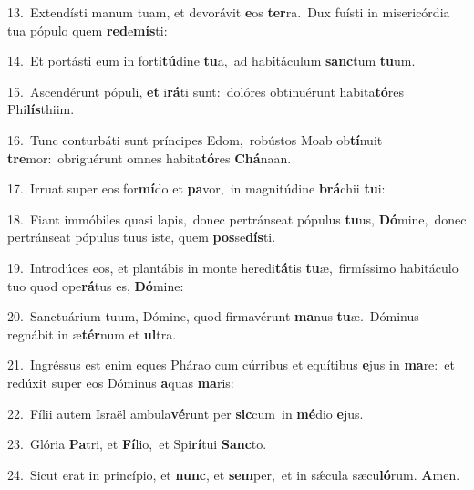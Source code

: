 {\numbfont\textcolor{\numbcolor}{13.}}~Extendísti manum tuam, et devorávit \textbf{e}\-os \textbf{ter}\-ra.~\star Dux fuísti in misericórdia tua pópulo quem \textbf{red}\-e\-\textbf{mís}\-ti:\par
{\numbfont\textcolor{\numbcolor}{14.}}~Et portásti eum in forti\-\textbf{tú}\-dine \textbf{tu}\-a,~\star ad habitáculum \textbf{sanc}\-tum \textbf{tu}\-um.\par
{\numbfont\textcolor{\numbcolor}{15.}}~Ascendérunt pópuli, \textbf{et} i\-\textbf{rá}\-ti sunt:~\star dolóres obtinuérunt habita\-\textbf{tó}\-res Phi\-\textbf{lís}\-thiim.\par
{\numbfont\textcolor{\numbcolor}{16.}}~Tunc conturbáti sunt príncipes Edom,~\dagger robústos Moab ob\-\textbf{tí}\-nuit \textbf{tre}\-mor:~\star obriguérunt omnes habita\-\textbf{tó}\-res \textbf{Chá}\-naan.\par
{\numbfont\textcolor{\numbcolor}{17.}}~Irruat super eos for\-\textbf{mí}\-do et \textbf{pa}\-vor,~\star in magnitúdine \textbf{brá}\-chii \textbf{tu}\-i:\par
{\numbfont\textcolor{\numbcolor}{18.}}~Fiant immóbiles quasi lapis,~\dagger donec pertránseat pópulus \textbf{tu}\-us, \textbf{Dó}\-mine,~\star donec pertránseat pópulus tuus iste, quem \textbf{pos}\-se\-\textbf{dís}\-ti.\par
{\numbfont\textcolor{\numbcolor}{19.}}~Introdúces eos, et plantábis in monte heredi\-\textbf{tá}\-tis \textbf{tu}\-æ,~\star firmíssimo habitáculo tuo quod ope\-\textbf{rá}\-tus es, \textbf{Dó}\-mine:\par
{\numbfont\textcolor{\numbcolor}{20.}}~Sanctuárium tuum, Dómine, quod firmavérunt \textbf{ma}\-nus \textbf{tu}\-æ.~\star Dóminus regnábit in æ\-\textbf{tér}\-num et \textbf{ul}\-tra.\par
{\numbfont\textcolor{\numbcolor}{21.}}~Ingréssus est enim eques Phárao cum cúrribus et equítibus \textbf{e}\-jus in \textbf{ma}\-re:~\star et redúxit super eos Dóminus \textbf{a}\-quas \textbf{ma}\-ris:\par
{\numbfont\textcolor{\numbcolor}{22.}}~Fílii autem Israël ambula\-\textbf{vé}\-runt per \textbf{sic}\-cum~\star in \textbf{mé}\-dio \textbf{e}\-jus.\par
{\numbfont\textcolor{\numbcolor}{23.}}~Glória \textbf{Pa}\-tri, et \textbf{Fí}\-lio,~\star et Spi\-\textbf{rí}\-tui \textbf{Sanc}\-to.\par
{\numbfont\textcolor{\numbcolor}{24.}}~Sicut erat in princípio, et \textbf{nunc}\-, et \textbf{sem}\-per,~\star et in sǽcula sæcu\-\textbf{ló}\-rum. \textbf{A}\-men.\par
